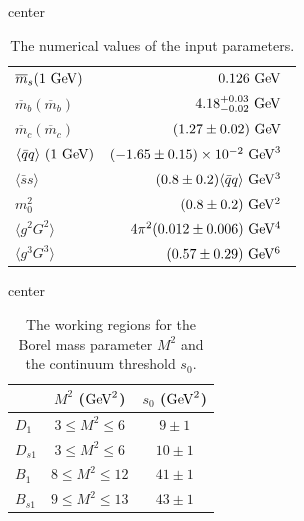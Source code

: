 \documentclass[prd,a4paper,preprint,preprintnumbers,nofootinbib,superscriptaddress]{revtex4-2}
\begin{document}
\begin{table}[hbt]
\centering
\begin{adjustbox}{center}
\renewcommand{\arraystretch}{1.2}
\setlength{\tabcolsep}{6pt}
\begin{tabular}{lr}
\toprule
$\overline{m}_s (1~\rm{GeV})$      & $0.126~\rm{GeV}$~\cite{ParticleDataGroup:2022pth} \\
$\overline{m}_b (\overline{m}_b)$  & $4.18^{+0.03}_{-0.02}~\rm{GeV}$~\cite{ParticleDataGroup:2022pth} \\
$\overline{m}_c (\overline{m}_c)$  & $(1.27 \pm 0.02)~\rm{GeV}$~\cite{ParticleDataGroup:2022pth} \\
$\langle \bar{q}q \rangle~\rm{(1~GeV)}$ & $(-1.65 \pm 0.15)\times 10^{-2}~\rm{GeV}^3$~\cite{Ioffe:2005ym} \\
$\langle \bar{s}s \rangle$         & $(0.8 \pm 0.2) \langle \bar{q}q \rangle~\rm{GeV^3}$~\cite{Ioffe:2005ym} \\
$m_0^2$                            & $(0.8 \pm 0.2)~\rm{GeV^2}$~\cite{Ioffe:2005ym} \\
$\langle g^2 G^2 \rangle$ & $ 4 \pi^2 (0.012 \pm 0.006)~\rm{GeV^4}$~\cite{Ioffe:2002ee} \\
$\langle g^3 G^3 \rangle$ & $(0.57 \pm 0.29)~\rm{GeV^6}$~\cite{Narison:2022paf} \\
  \bottomrule
\end{tabular}
\end{adjustbox}
\caption{The numerical values of the input parameters.}
\label{tab:1}
\end{table}



\begin{table}[hbt]
\centering
\begin{adjustbox}{center}
\renewcommand{\arraystretch}{1.2}
\setlength{\tabcolsep}{6pt}
\begin{tabular}{lcc}
\toprule
                & \(M^2\)  (\(\rm{GeV}^2\)) & \(s_0\) (\(\rm{GeV}^2\))  \\
\midrule
\(D_1\)         & \(3 \le M^2 \le 6\)    & \(9 \pm 1\)   \\
\(D_{s1}\)    & \(3 \le M^2 \le 6\)    &  \(10 \pm 1\)  \\
\(B_1\)         & \(8 \le M^2 \le 12\)   & \(41 \pm 1\)  \\
\(B_{s1}\)    & \(9 \le M^2 \le 13\)   & \(43 \pm 1\)  \\
\bottomrule
\end{tabular}
\end{adjustbox}
\caption{The working regions for the Borel mass parameter \(M^2\) and the continuum threshold \(s_0\).}
\label{tab:region}
\end{table}
\end{document}

